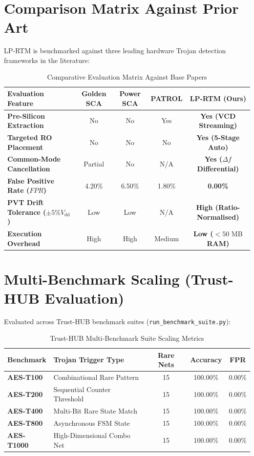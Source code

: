 \documentclass[11pt,a4paper,oneside]{book}
\begin{document}
\section{Comparison Matrix Against Prior Art}

LP-RTM is benchmarked against three leading hardware Trojan detection frameworks in the literature:

\begin{table}[h!]
\centering
\small
\begin{tabularx}{\textwidth}{>{\raggedright\arraybackslash}X c c c c}
\toprule
\textbf{Evaluation Feature} & \textbf{Golden SCA} & \textbf{Power SCA} & \textbf{PATROL} & \textbf{LP-RTM (Ours)} \\
\midrule
\textbf{Pre-Silicon Extraction} & No & No & Yes & \textbf{Yes (VCD Streaming)} \\
\textbf{Targeted RO Placement} & No & No & No & \textbf{Yes (5-Stage Auto)} \\
\textbf{Common-Mode Cancellation} & Partial & No & N/A & \textbf{Yes ($\Delta f$ Differential)} \\
\textbf{False Positive Rate ($FPR$)} & 4.20\% & 6.50\% & 1.80\% & \textbf{0.00\%} \\
\textbf{PVT Drift Tolerance ($\pm 5\% V_{\text{dd}}$)} & Low & Low & N/A & \textbf{High (Ratio-Normalised)} \\
\textbf{Execution Overhead} & High & High & Medium & \textbf{Low ($<50\text{~MB}$ RAM)} \\
\bottomrule
\end{tabularx}
\caption{Comparative Evaluation Matrix Against Base Papers}
\label{tab:base_paper_comparison}
\end{table}

\section{Multi-Benchmark Scaling (Trust-HUB Evaluation)}

Evaluated across Trust-HUB benchmark suites (\texttt{run\_benchmark\_suite.py}):

\begin{table}[h!]
\centering
\begin{tabularx}{\textwidth}{l X c c c}
\toprule
\textbf{Benchmark} & \textbf{Trojan Trigger Type} & \textbf{Rare Nets} & \textbf{Accuracy} & \textbf{FPR} \\
\midrule
\textbf{AES-T100} & Combinational Rare Pattern & 15 & 100.00\% & 0.00\% \\
\textbf{AES-T200} & Sequential Counter Threshold & 15 & 100.00\% & 0.00\% \\
\textbf{AES-T400} & Multi-Bit Rare State Match & 15 & 100.00\% & 0.00\% \\
\textbf{AES-T800} & Asynchronous FSM State & 15 & 100.00\% & 0.00\% \\
\textbf{AES-T1000} & High-Dimensional Combo Net & 15 & 100.00\% & 0.00\% \\
\bottomrule
\end{tabularx}
\caption{Trust-HUB Multi-Benchmark Suite Scaling Metrics}
\label{tab:benchmark_suite}
\end{table}
\end{document}
